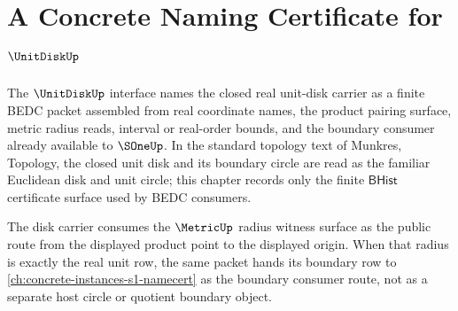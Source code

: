 \chapter{A Concrete Naming Certificate for $\UnitDiskUp$}
\label{ch:concrete-instances-unitdisk-namecert}

The $\UnitDiskUp$ interface names the closed real unit-disk carrier as a finite BEDC packet assembled from real coordinate names, the product pairing surface, metric radius reads, interval or real-order bounds, and the boundary consumer already available to $\SOneUp$. In the standard topology text of Munkres, Topology, the closed unit disk and its boundary circle are read as the familiar Euclidean disk and unit circle; this chapter records only the finite $\mathsf{BHist}$ certificate surface used by BEDC consumers.

The disk carrier consumes the $\MetricUp$ radius witness surface as the public route from the displayed product point to the displayed origin. When that radius is exactly the real unit row, the same packet hands its boundary row to \autoref{ch:concrete-instances-s1-namecert} as the boundary consumer route, not as a separate host circle or quotient boundary object.

